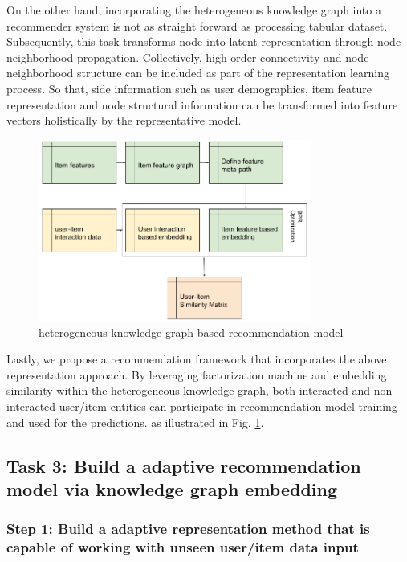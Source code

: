 On the other hand, incorporating the heterogeneous knowledge graph into a recommender system is not as straight forward as processing tabular dataset. Subsequently, this task transforms node into latent representation through node neighborhood propagation. Collectively, high-order connectivity and node neighborhood structure can be included as part of the representation learning process. So that, side information such as user demographics, item feature representation and node structural information can be transformed into feature vectors holistically by the representative model.

\begin{figure}[!ht]
    \centering
    \includegraphics[width=0.8\textwidth]{figs/hkg.png}
    \caption{heterogeneous knowledge graph based recommendation model}\label{fig:meta_task}
\end{figure}

Lastly, we propose a recommendation framework that incorporates the above representation approach. By leveraging factorization machine and embedding similarity within the heterogeneous knowledge graph, both interacted and non-interacted user/item entities can participate in recommendation model training and used for the predictions. as illustrated in Fig. \ref{fig:meta_task}.

\subsection{Task 3: Build a adaptive recommendation model via knowledge graph embedding}

\subsubsection*{Step 1: Build a adaptive representation method that is capable of working with unseen user/item data input}

